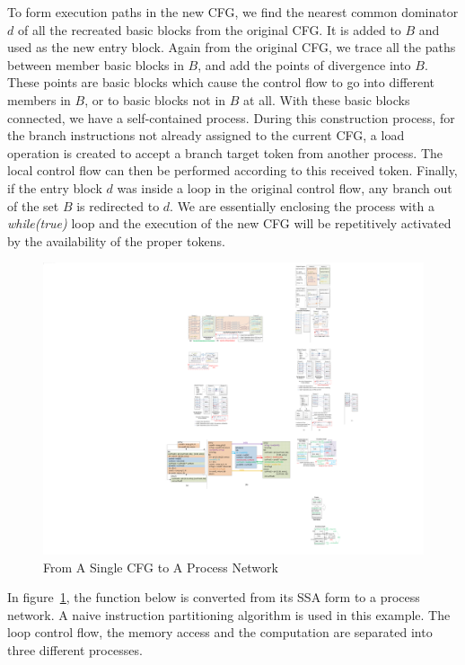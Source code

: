 \documentclass{sig-alternate}
\begin{document}
To form execution paths in the new CFG, we find the nearest common dominator $d$ of all the recreated basic blocks from the original CFG. It is added to $B$ and used as the new entry block. Again from the original CFG, we trace all the paths between member basic blocks in $B$, and add the points of divergence into $B$. These points are basic blocks which cause
the control flow to go into different members in $B$, or to basic blocks not in $B$ at all.
With these basic blocks connected, we have a self-contained process. 
During this construction process, for the branch instructions not already assigned to the current CFG, a load operation is created to accept a branch target token from another process. The local control flow can then be performed according to this received token. 
Finally, if the entry block $d$ was inside a loop in the original control flow, any branch out of the set $B$ is redirected to $d$. We are essentially enclosing the process with a \textit{while(true)} loop and the execution of the new CFG will be repetitively activated by the availability of the proper tokens.


\begin{figure}[htp]
\begin{center}
\includegraphics[width=1.0\linewidth]{fig/convert.pdf}
\caption{From A Single CFG to A Process Network
\label{fig:totalFlow}}
\end{center}
\vspace{-2.0em}
\end{figure}

In figure~\ref{fig:totalFlow}, the function below is converted from its SSA form to a process network.  A naive instruction partitioning algorithm is used in this example. The loop control flow, the memory access and the computation are separated into three different
processes.
\end{document}
